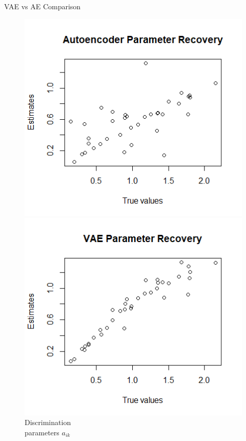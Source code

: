 \documentclass{beamer}
\theoremstyle{definition}
\begin{document}
\begin{frame}{VAE vs AE Comparison}
\begin{figure}[h!]
\includegraphics[width=.9\textwidth]{../img/aied_results/ae_a_corr.png}
\endminipage\hfill
{}
\includegraphics[width=.9\textwidth]{../img/aied_results/vae_a_corr.png}
\endminipage\hfill
{}
{\footnotesize Discrimination \\ parameters $a_{ik}$}
\endminipage\hfill
{}

\end{figure}
\end{frame}
\end{document}
